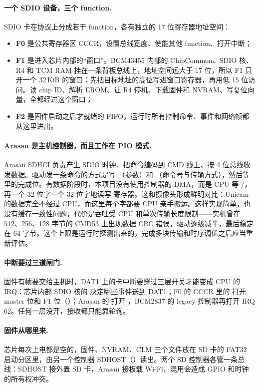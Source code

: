 \paragraph{一个 SDIO 设备，三个 function.} SDIO 卡在协议上分成若干 function，各有独立的 17 位寄存器地址空间：
\begin{itemize}
  \item \textbf{F0} 是公共寄存器区 CCCR，设置总线宽度、使能其他 function、打开中断；
  \item \textbf{F1} 是进入芯片内部的“窗口”。BCM43455 内部的 ChipCommon、SDIO 核、R4 和 TCM RAM 挂在一条背板总线上，地址空间远大于 17 位，所以 F1 只开一个 32\,KiB 的窗口：先把目标地址的高位写进窗口寄存器，再用低 15 位访问。读 chip ID、解析 EROM、让 R4 停机、下载固件和 NVRAM、写复位向量，全都经过这个窗口；
  \item \textbf{F2} 是固件启动之后才就绪的 FIFO，运行时所有控制命令、事件和网络帧都从这里进出。
\end{itemize}

\paragraph{Arasan 是主机控制器，而且工作在 PIO 模式.} Arasan SDHCI 负责产生 SDIO 时钟、把命令编码到 CMD 线上、按 4 位总线收发数据。驱动发一条命令的方式是写 （参数）和 （命令号与传输方式），然后等  里的完成位。有数据阶段时，本项目没有使用控制器的 DMA，而是 CPU 等 /，再一个 32 位字一个 32 位字地读写  寄存器。这和摄像头形成鲜明对比：Unicam 的数据完全不经过 CPU，而这里每个字都要 CPU 亲手搬运。这样实现简单，也没有缓存一致性问题，代价是吞吐受 CPU 和单次传输长度限制——实机曾在 512、256、128 字节的 CMD53 上出现数据 CRC 错误，驱动逐级减半，最后稳定在 64 字节。这个上限是运行时探测出来的，完成多块传输和时序调优之后应当重新评估。

\paragraph{中断要过三道闸门.} 固件有帧要交给主机时，DAT1 上的卡中断要穿过三层开关才能变成 CPU 的 IRQ：芯片内部 SDIO 核的  决定哪些事件送到 DAT1；F0 的 CCCR 里的  打开 master 位和 F1 位（）；Arasan 的  打开 ，BCM2837 的 legacy 控制器再打开 IRQ 62。任何一层没开，接收都只能靠轮询。

\paragraph{固件从哪里来.} 芯片每次上电都是空的，固件、NVRAM、CLM 三个文件放在 SD 卡的 FAT32 启动分区里，由另一个控制器 SDHOST（）读出。两个 SD 控制器各管一条总线：SDHOST 接外置 SD 卡，Arasan 接板载 Wi-Fi，混用会造成 GPIO 和时钟的所有权冲突。


